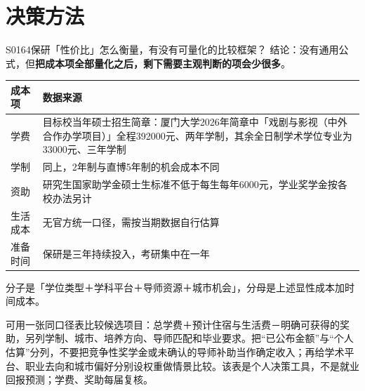 \section{决策方法}
\begin{qa}{S0164}{保研「性价比」怎么衡量，有没有可量化的比较框架？}
结论：没有通用公式，但\textbf{把成本项全部量化之后，剩下需要主观判断的项会少很多}。

\par\vspace{2pt}\nobreak\begin{center}\footnotesize
\begin{tabularx}{\textwidth}{>{\raggedright\arraybackslash}X>{\raggedright\arraybackslash}X}
\toprule
\textbf{成本项} & \textbf{数据来源} \\ \midrule
学费 & 目标校当年硕士招生简章：厦门大学2026年简章中「戏剧与影视（中外合作办学项目）」全程392000元、两年学制，其余全日制学术学位专业为33000元、三年学制 \\
学制 & 同上，2年制与直博5年制的机会成本不同 \\
资助 & 研究生国家助学金硕士生标准不低于每生每年6000元，学业奖学金按各校办法另计 \\
生活成本 & 无官方统一口径，需按当期数据自行估算 \\
准备时间 & 保研是三年持续投入，考研集中在一年 \\
\bottomrule
\end{tabularx}
\end{center}\vspace{2pt}\par

分子是「学位类型＋学科平台＋导师资源＋城市机会」，分母是上述显性成本加时间成本。

可用一张同口径表比较候选项目：总学费＋预计住宿与生活费－明确可获得的奖助，另列学制、城市、培养方向、导师匹配和毕业要求。把“已公布金额”与“个人估算”分列，不要把竞争性奖学金或未确认的导师补助当作确定收入；再给学术平台、职业去向和城市偏好分别设权重做情景比较。该表是个人决策工具，不是就业回报预测；学费、奖助每届复核。
\end{qa}

